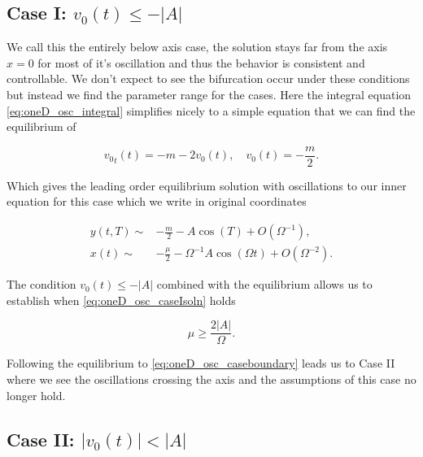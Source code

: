 \subsection{Case I: $v_0(t) \le -|A|$}
\label{subsec:oneD_osc_CaseI}

We call this the entirely below axis case, the solution stays far from the axis $x=0$ for most of it's oscillation and thus the behavior is consistent and controllable. We don't expect to see the bifurcation occur under these conditions but instead we find the parameter range for the cases. Here the integral equation \eqref{eq:oneD_osc_integral} simplifies nicely to a simple equation that we can find the equilibrium of

\begin{equation*}
{v_0}_t(t)=-m-2v_0(t),\quad v_0(t)=-\frac{m}{2}.
\end{equation*}

Which gives the leading order equilibrium solution with oscillations to our inner equation for this case which we write in original coordinates

\begin{equation}\label{eq:oneD_osc_caseIsoln}
\begin{aligned}
y(t,T)\sim& -\frac{m}{2}-A\cos(T)+O(\Omega^{-1}),\\ 
x(t)\sim& -\frac{\mu}{2}-\Omega^{-1} A\cos(\Omega t)+O(\Omega^{-2}).
\end{aligned}
\end{equation}

The condition $v_0(t)\le -|A|$ combined with the equilibrium allows us to establish when \eqref{eq:oneD_osc_caseIsoln} holds

\begin{equation}\label{eq:oneD_osc_caseboundary}
\mu\ge \frac{2|A|}{\Omega}.
\end{equation}

Following the equilibrium to \eqref{eq:oneD_osc_caseboundary} leads us to Case II where we see the oscillations crossing the axis and the assumptions of this case no longer hold.

\subsection{Case II: $|v_0(t)|< |A|$}
\label{subsec:oneD_osc_CaseII}

